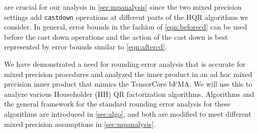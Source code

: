  are crucial for our analysis in \cref{sec:mpanalysis} since  
the two mixed precision settings add {\tt castdown} operations at different parts of the HQR algorithms we consider.
In general, error bounds in the fashion of \cref{eqn:beforecd} can be used before the cast down operations and the action of the cast down is best represented by error bounds similar to \cref{eqn:aftercd}.\par

We have demonstrated a need for rounding error analysis that is accurate for mixed precision procedures and analyzed the inner product in an ad hoc mixed precision inner product that mimics the TensorCore bFMA.
We will use this to analyze various Householder (HH) QR factorization algorithms.
Algorithms and the general framework for the standard rounding error analysis for these algorithms are introduced in \cref{sec:algo}, and both are modified to meet different mixed precision assumptions in \cref{sec:mpanalysis}.